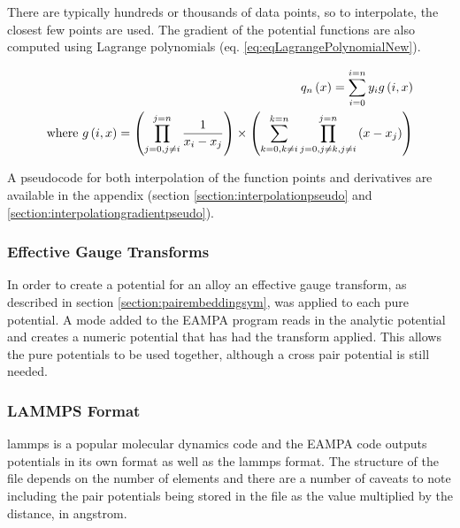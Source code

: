 There are typically hundreds or thousands of data points, so to interpolate, the closest few points are used.  The gradient of the potential functions are also computed using Lagrange polynomials (eq. \ref{eq:eqLagrangePolynomialNew}).

\begin{equation}
\begin{split}
q_n \left( x \right) = \sum_{i=0}^{i=n} y_{i} g \left(i,  x \right) \\
\textnormal{where    } g \left(i, x \right) = \left( \prod_{j=0, j \neq i}^{j=n} \frac{1}{x_i - x_j} \right) \times \left( \sum_{k=0, k \neq i}^{k=n} \prod_{j=0, j \neq k, j \neq i}^{j=n} \left( x - x_j \right) \right)
\end{split}
\label{eq:eqLagrangePolynomialNew}
\end{equation}

A pseudocode for both interpolation of the function points and derivatives are available in the appendix (section \ref{section:interpolationpseudo} and \ref{section:interpolationgradientpseudo}).



\subsubsection{Effective Gauge Transforms}

In order to create a potential for an alloy an effective gauge transform, as described in section \ref{section:pairembeddingsym}, was applied to each pure potential.  A mode added to the EAMPA program reads in the analytic potential and creates a numeric potential that has had the transform applied.  This allows the pure potentials to be used together, although a cross pair potential is still needed.



\subsubsection{LAMMPS Format}

\acrshort{lammps} is a popular molecular dynamics code and the EAMPA code outputs potentials in its own format as well as the \acrshort{lammps} format.  The structure of the file depends on the number of elements and there are a number of caveats to note including the pair potentials being stored in the file as the value multiplied by the distance, in angstrom\cite{lammpseamformat}.




